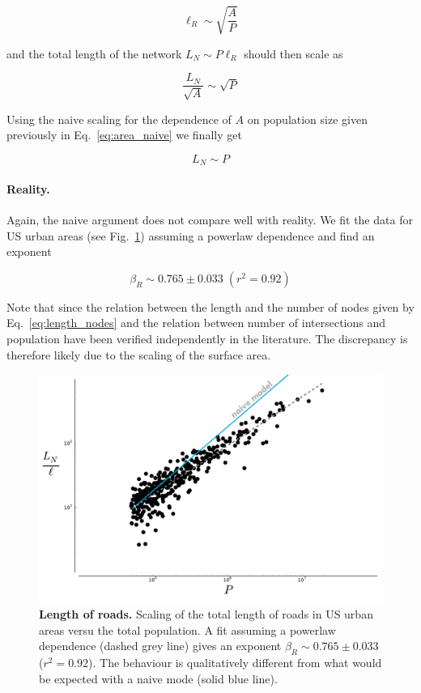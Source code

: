 \begin{equation} 
    \ell_R \sim \sqrt{\frac{A}{P}} 
    \label{eq:length_nodes}
\end{equation}

and the total length of the network $L_N \sim P\ell_R$ should then scale as

\begin{equation} 
    \frac{L_N}{\sqrt{A}} \sim \sqrt{P} 
\end{equation}

Using the naive scaling for the dependence of $A$ on population size given
previously in Eq.~\ref{eq:area_naive} we finally get 

\begin{equation} 
    L_N \sim P
\end{equation}

\paragraph{Reality.} Again, the naive argument does not compare well with
reality. We fit the data for US urban areas (see
Fig.~\ref{fig:scaling_lanemiles}) assuming a powerlaw dependence and find an
exponent

\begin{equation}
    \boxed{\beta_R \sim 0.765 \pm 0.033\;(r^2 = 0.92)}
\end{equation}

Note that since the relation between the length and the number of nodes given by
Eq.~\ref{eq:length_nodes} and the relation between number of intersections and
population have been verified independently in the literature. The discrepancy
is therefore likely due to the scaling of the surface area.

\begin{figure}
    \centering
    \includegraphics[width=\textwidth]{gfx/chapter-scaling/scaling_lanemiles.pdf}
    \caption{{\bf Length of roads.} Scaling of the total length of roads in US urban areas versu the
    total population. A fit assuming a powerlaw dependence (dashed grey line)
gives an exponent $\beta_R \sim 0.765 \pm 0.033$ ($r^2=0.92$). The behaviour is
qualitatively different from what would be expected with a naive mode (solid
blue line).\label{fig:scaling_lanemiles}}
\end{figure}



